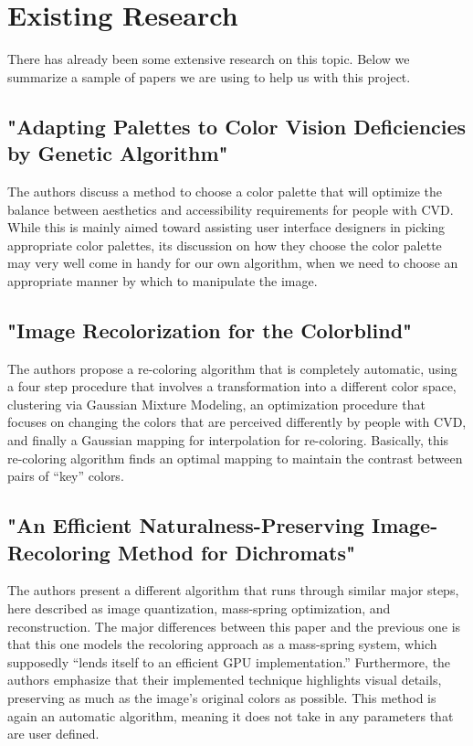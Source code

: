\documentclass[10pt,twocolumn,letterpaper]{article}
\begin{document}
\section{Existing Research}

There has already been some extensive research on this topic. Below we summarize a sample of papers we are using to help us with this project.

\subsection{"Adapting Palettes to Color Vision Deficiencies by Genetic Algorithm"}

The authors discuss a method to choose a color palette that will optimize the balance between aesthetics and accessibility requirements for people with CVD. While this is mainly aimed toward assisting user interface designers in picking appropriate color palettes, its discussion on how they choose the color palette may very well come in handy for our own algorithm, when we need to choose an appropriate manner by which to manipulate the image. 


\subsection{"Image Recolorization for the Colorblind"}

The authors propose a re-coloring algorithm that is completely automatic, using a four step procedure that involves a transformation into a different color space, clustering via Gaussian Mixture Modeling, an optimization procedure that focuses on changing the colors that are perceived differently by people with CVD, and finally a Gaussian mapping for interpolation for re-coloring. Basically, this re-coloring algorithm finds an optimal mapping to maintain the contrast between pairs of “key” colors.

\subsection{"An Efficient Naturalness-Preserving Image-Recoloring Method for Dichromats"}

The authors present a different algorithm that runs through similar major steps, here described as image quantization, mass-spring optimization, and reconstruction. The major differences between this paper and the previous one is that this one models the recoloring approach as a mass-spring system, which supposedly “lends itself to an efficient GPU implementation.” Furthermore, the authors emphasize that their implemented technique highlights visual details, preserving as much as the image’s original colors as possible. This method is again an automatic algorithm, meaning it does not take in any parameters that are user defined.
\end{document}
